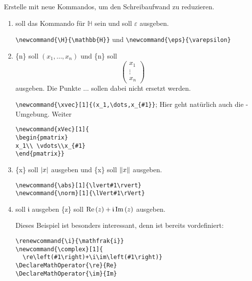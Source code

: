 \item Erstelle mit  neue Kommandos, um den Schreibaufwand zu reduzieren.
    \begin{enumerate}
        \item {} soll das Kommando für $\mathbb{H}$ sein und 
            soll $\varepsilon$ ausgeben.
            \begin{loesung}
                \verb|\newcommand{\H}{\mathbb{H}}| und \verb|\newcommand{\eps}{\varepsilon}|
            \end{loesung}
        \item {}\{n\} soll $(x_1,\dots,x_n)$ und \{n\} soll 
            \[
                \begin{pmatrix}
                x_1 \\ \vdots \\ x_n
                \end{pmatrix}
            \]
            ausgeben. Die Punkte $\dots$ sollen dabei nicht ersetzt werden.
            \begin{loesung}
                \verb|\newcommand{\xvec}[1]{(x_1,\dots,x_{#1}}|; Hier geht
                natürlich auch die -Umgebung. Weiter
            \begin{verbatim}
\newcommand{xVec}[1]{
\begin{pmatrix}
x_1\\ \vdots\\x_{#1}
\end{pmatrix}}
            \end{verbatim}
            \end{loesung}
        \item {}\{x\} soll $\abs{x}$ ausgeben und \{x\}
            soll $\norm{x}$ ausgeben.
            \begin{loesung}
                \begin{verbatim}
\newcommand{\abs}[1]{\lvert#1\rvert}
\newcommand{\norm}[1]{\lVert#1\rVert}
                \end{verbatim}
            \end{loesung}
        \item {} soll $\mathfrak{i}$ ausgeben \{z\} soll
            $\complex{z}$ ausgeben.
            \begin{loesung}
                Dieses Beispiel ist besonders interessant, denn  ist
                bereits vordefiniert: 
                \begin{verbatim}
\renewcommand{\i}{\mathfrak{i}}
\newcommand{\complex}[1]{
  \re\left(#1\right)+\i\im\left(#1\right)}
\DeclareMathOperator{\re}{Re}
\DeclareMathOperator{\im}{Im}
                \end{verbatim}
            \end{loesung}
    \end{enumerate}